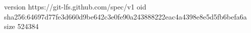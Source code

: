 version https://git-lfs.github.com/spec/v1
oid sha256:64697d77fe3d660d9be642c3e0fe90a243888222eac4a4398e8e5d5fb6befa6a
size 524384

